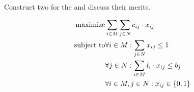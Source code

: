 \begin{exercise}
Construct two  for the  and discuss their merits.

\begin{eqnarray}
\mbox{maximize}&\sumdomain[i]{M}{\sumdomain[j]{N}{c_{ij}\cdot x_{ij}}}\eqnlab{ex72-m}\\
\mbox{subject to}&\forall i\in M:\sumdomain[j]{N}{x_{ij}}\leq 1\eqnlab{ex72-c1}\\
&\forall j\in N:\sumdomain[i]{M}{l_i\cdot x_{ij}}\leq b_j\eqnlab{ex72-c2}\\
&\forall i\in M,j\in N:x_{ij}\in\accl{0,1}\eqnlab{ex72-c3}
\end{eqnarray}
\end{exercise}